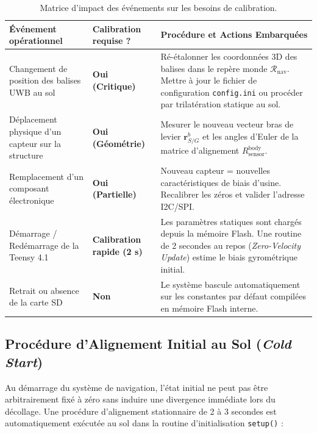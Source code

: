 \documentclass[../Implementation.tex]{subfiles}
\begin{document}
\begin{table}[htbp]
\centering
\small
\begin{tabular}{p{4.0cm}p{3.0cm}p{8cm}}
\toprule
\textbf{Événement opérationnel} & \textbf{Calibration requise ?} & \textbf{Procédure et Actions Embarquées} \\
\midrule
Changement de position des balises UWB au sol & \textbf{Oui (Critique)} & Ré-étalonner les coordonnées 3D des balises dans le repère monde $\mathcal{R}_{\text{nav}}$. Mettre à jour le fichier de configuration \lstinline|config.ini| ou procéder par trilatération statique au sol. \\
\addlinespace
Déplacement physique d'un capteur sur la structure & \textbf{Oui (Géométrie)} & Mesurer le nouveau vecteur bras de levier $\mathbf{r}_{S/G}^b$ et les angles d'Euler de la matrice d'alignement $R_{\text{sensor}}^{\text{body}}$. \\
\addlinespace
Remplacement d'un composant électronique & \textbf{Oui (Partielle)} & Nouveau capteur = nouvelles caractéristiques de biais d'usine. Recalibrer les zéros et valider l'adresse I2C/SPI. \\
\addlinespace
Démarrage / Redémarrage de la Teensy 4.1 & \textbf{Calibration rapide (2 s)} & Les paramètres statiques sont chargés depuis la mémoire Flash. Une routine de 2 secondes au repos (\textit{Zero-Velocity Update}) estime le biais gyrométrique initial. \\
\addlinespace
Retrait ou absence de la carte SD & \textbf{Non} & Le système bascule automatiquement sur les constantes par défaut compilées en mémoire Flash interne. \\
\bottomrule
\end{tabular}
\caption{Matrice d'impact des événements sur les besoins de calibration.}
\label{tab:matrice_calibrations}
\end{table}

\subsection{Procédure d'Alignement Initial au Sol (\textit{Cold Start})}

Au démarrage du système de navigation, l'état initial ne peut pas être arbitrairement fixé à zéro sans induire une divergence immédiate lors du décollage. Une procédure d'alignement stationnaire de 2 à 3 secondes est automatiquement exécutée au sol dans la routine d'initialisation \lstinline|setup()| :
\end{document}
